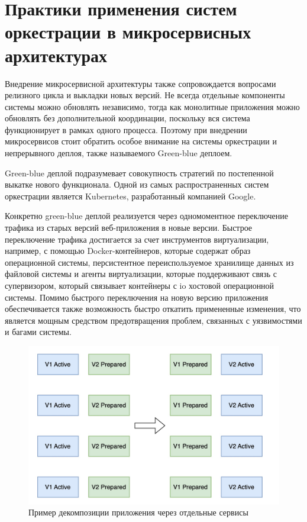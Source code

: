 \section{Практики применения систем оркестрации в микросервисных архитектурах}
Внедрение микросервисной архитектуры также сопровождается вопросами релизного цикла и выкладки новых версий. Не всегда отдельные компоненты 
системы можно обновлять независимо, тогда как монолитные приложения можно обновлять без дополнительной координации, поскольку вся
система функционирует в рамках одного процесса. Поэтому при внедрении микросервисов стоит обратить особое внимание на системы оркестрации
и непрерывного деплоя, также называемого Green-blue деплоем. 

Green-blue деплой подразумевает совокупность стратегий по постепенной выкатке нового функционала. Одной из
самых распространенных систем оркестрации является Kubernetes, разработанный компанией Google.

Конкретно green-blue деплой реализуется через одномоментное переключение трафика из старых версий веб-приложения
в новые версии. Быстрое переключение трафика достигается за счет инструментов виртуализации, например, с помощью Docker-контейнеров,
которые содержат образ операционной системы, персистентное переиспользуемое хранилище данных из файловой системы и агенты виртуализации, которые
поддерживают связь с супервизором, который связывает контейнеры с io хостовой операционной системы.
Помимо быстрого переключения на новую версию приложения обеспечивается также возможность быстро откатить
примененные изменения, что является мощным средством предотвращения проблем, связанных с уязвимостями и багами
системы. 
\begin{figure}[H]
    \centering
    \includegraphics[width=0.8\linewidth]{img/gb.jpg}
    \caption{Пример декомпозиции приложения через отдельные сервисы}
    \label{fig:y}
\end{figure}


